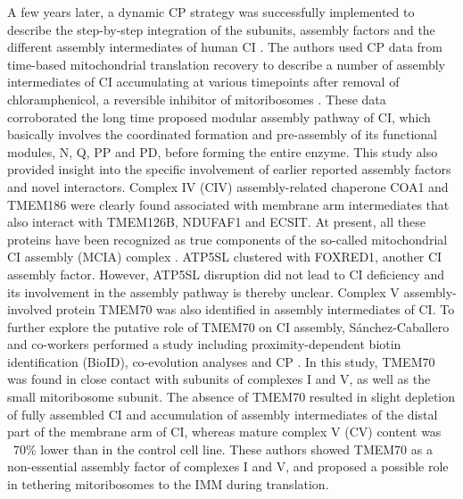 A few years later, a dynamic CP strategy was successfully implemented to describe the step-by-step integration of the subunits, assembly factors and the different assembly intermediates of human CI \cite{Guerrero-Castillo_2017a}. The authors used CP data from time-based mitochondrial translation recovery to describe a number of assembly intermediates of CI accumulating at various timepoints after removal of chloramphenicol, a reversible inhibitor of mitoribosomes \cite{Ugalde_2004}. These data corroborated the long time proposed modular assembly pathway of CI, which basically involves the coordinated formation and pre-assembly of its functional modules, N, Q, PP and PD, before forming the entire enzyme. This study also provided insight into the specific involvement of earlier reported assembly factors and novel interactors. Complex IV (CIV) assembly-related chaperone COA1 and TMEM186 were clearly found associated with membrane arm intermediates that also interact with TMEM126B, NDUFAF1 and ECSIT. At present, all these proteins have been recognized as true components of the so-called mitochondrial CI assembly (MCIA) complex \cite{Formosa_2020}. ATP5SL clustered with FOXRED1, another CI assembly factor. However, ATP5SL disruption did not lead to CI deficiency \cite{Andrews_2013} and its involvement in the assembly pathway is thereby unclear. Complex V assembly-involved protein TMEM70 was also identified in assembly intermediates of CI. To further explore the putative role of TMEM70 on CI assembly, Sánchez-Caballero and co-workers performed a study including proximity-dependent biotin identification (BioID), co-evolution analyses and CP \cite{Sanchez-Caballero_2020}. In this study, TMEM70 was found in close contact with subunits of complexes I and V, as well as the small mitoribosome subunit. The absence of TMEM70 resulted in slight depletion of fully assembled CI and accumulation of assembly intermediates of the distal part of the membrane arm of CI, whereas mature complex V (CV) content was ~70\% lower than in the control cell line. These authors showed TMEM70 as a non-essential assembly factor of complexes I and V, and proposed a possible role in tethering mitoribosomes to the IMM during translation.
